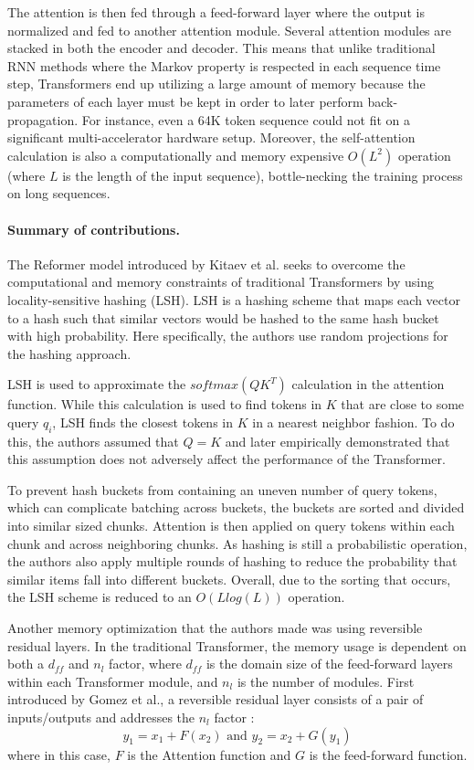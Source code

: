 \documentclass{article}
\begin{document}
The attention is then fed through a feed-forward layer where the output is normalized and fed to another attention module. Several attention modules are stacked in both the encoder and decoder. This means that unlike traditional RNN methods where the Markov property is respected in each sequence time step, Transformers end up utilizing a large amount of memory because the parameters of each layer must be kept in order to later perform back-propagation. For instance, even a 64K token sequence could not fit on a significant multi-accelerator hardware setup. Moreover, the self-attention calculation is also a computationally and memory expensive $O(L^2)$ operation (where $L$ is the length of the input sequence), bottle-necking the training process on long sequences. 

\paragraph{Summary of contributions.}

The Reformer model introduced by Kitaev et al. seeks to overcome the computational and memory constraints of traditional Transformers by using locality-sensitive hashing (LSH). LSH is a hashing scheme that maps each vector to a hash such that similar vectors would be hashed to the same hash bucket with high probability. Here specifically, the authors use random projections for the hashing approach. 

LSH is used to approximate the $softmax(QK^T)$ calculation in the attention function. While this calculation is used to find tokens in $K$ that are close to some query $q_i$, LSH finds the closest tokens in $K$ in a nearest neighbor fashion. To do this, the authors assumed that $Q=K$ and later empirically demonstrated that this assumption does not adversely affect the performance of the Transformer. 

To prevent hash buckets from containing an uneven number of query tokens, which can complicate batching across buckets, the buckets are sorted and divided into similar sized chunks. Attention is then applied on query tokens within each chunk and across neighboring chunks. As hashing is still a probabilistic operation, the authors also apply multiple rounds of hashing to reduce the probability that similar items fall into different buckets. Overall, due to the sorting that occurs, the LSH scheme is reduced to an $O(Llog(L))$ operation. 

Another memory optimization that the authors made was using reversible residual layers. In the traditional Transformer, the memory usage is dependent on both a $d_{ff}$ and $n_l$ factor, where $d_{ff}$ is the domain size of the feed-forward layers within each Transformer module, and $n_l$ is the number of modules. First introduced by Gomez et al., a reversible residual layer consists of a pair of inputs/outputs and addresses the $n_l$ factor \cite{gomez2017reversible}: 
$$
	y_1 = x_1 + F(x_2) \text{ and } y_2 = x_2 + G(y_1)
$$
where in this case, $F$ is the Attention function and $G$ is the feed-forward function. 
\end{document}
